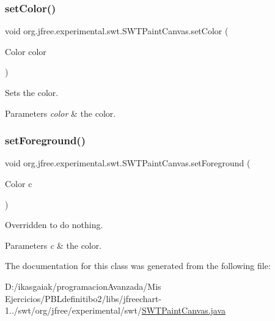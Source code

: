 \subsubsection{\texorpdfstring{set\+Color()}{setColor()}}
{\footnotesize\ttfamily void org.\+jfree.\+experimental.\+swt.\+S\+W\+T\+Paint\+Canvas.\+set\+Color (\begin{DoxyParamCaption}\item[{Color}]{color }\end{DoxyParamCaption})}

Sets the color.


\begin{DoxyParams}{Parameters}
{\em color} & the color. \\
\hline
\end{DoxyParams}
\mbox{\label{classorg_1_1jfree_1_1experimental_1_1swt_1_1_s_w_t_paint_canvas_a38eaa27c1bac87d09352ece9a710ea31}} 
\subsubsection{\texorpdfstring{set\+Foreground()}{setForeground()}}
{\footnotesize\ttfamily void org.\+jfree.\+experimental.\+swt.\+S\+W\+T\+Paint\+Canvas.\+set\+Foreground (\begin{DoxyParamCaption}\item[{Color}]{c }\end{DoxyParamCaption})}

Overridden to do nothing.


\begin{DoxyParams}{Parameters}
{\em c} & the color. \\
\hline
\end{DoxyParams}


The documentation for this class was generated from the following file\+:\begin{DoxyCompactItemize}
\item 
D\+:/ikasgaiak/programacion\+Avanzada/\+Mis Ejercicios/\+P\+B\+Ldefinitibo2/libs/jfreechart-\/1../swt/org/jfree/experimental/swt/\mbox{\hyperlink{_s_w_t_paint_canvas_8java}{S\+W\+T\+Paint\+Canvas.\+java}}\end{DoxyCompactItemize}
